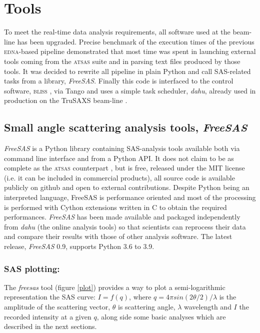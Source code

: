 \documentclass[preprint]{iucr}              %
\begin{document}
\section{Tools}

To meet the real-time data analysis requirements, all software used at the beam-line has been upgraded.
Precise benchmark of the execution times of the previous \textsc{edna}-based pipeline demonstrated that 
most time was spent in launching external tools coming from the \textsc{atsas} suite and in parsing text files produced by those tools.
It was decided to rewrite all pipeline in plain Python \cite{python} and call SAS-related tasks from a library, \textit{FreeSAS}. 
Finally this code is interfaced to the control software, \textsc{bliss} \cite{bliss}, via Tango \cite{tango} and uses a simple task scheduler, \textit{dahu}, already used in production on the TruSAXS beam-line \cite{id02_2022}.

\subsection{Small angle scattering analysis tools, \textit{FreeSAS}}

\textit{FreeSAS} is a Python library containing SAS-analysis tools available both via command line interface and from a Python API. 
It does not claim to be as complete as the \textsc{atsas} counterpart \cite{ATSAS3},
but is free, released under the MIT license (i.e. it can be included in commercial products), all source code is available publicly on github \cite{freesas} and
open to external contributions.
Despite Python being an interpreted language, FreeSAS is performance oriented and most of the processing is performed with Cython \cite{cython} extensions written in C to obtain the required performances. 
\textit{FreeSAS} has been made available and packaged independently from \textit{dahu} (the online analysis tools) so that scientists can reprocess their data and compare their results with those of other analysis software. 
The latest release, \textit{FreeSAS} 0.9, supports Python 3.6 to 3.9.

\subsubsection{SAS plotting:} The \textit{freesas} tool (figure \ref{plot}) provides a way to plot  a semi-logarithmic representation the SAS curve: $I=f(q)$, where $q = 4\pi sin(2\theta/2)/\lambda$ is the amplitude of the scattering vector, $\theta$ is scattering angle, $\lambda$ wavelength and $I$ the recorded intensity at a given $q$, along side some basic analyses which are described in the next sections.
\end{document}
